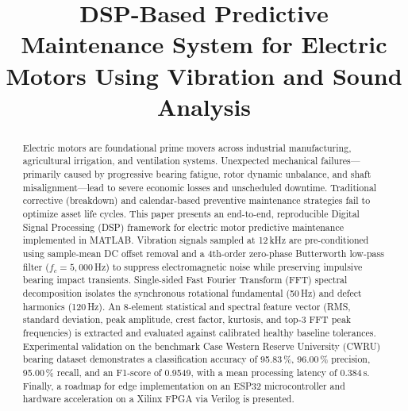 \documentclass[conference,a4paper]{IEEEtran}
\begin{document}
\title{DSP-Based Predictive Maintenance System for Electric Motors Using Vibration and Sound Analysis}

\author{
}

\maketitle

\begin{abstract}
Electric motors are foundational prime movers across industrial manufacturing, agricultural irrigation, and ventilation systems. Unexpected mechanical failures---primarily caused by progressive bearing fatigue, rotor dynamic unbalance, and shaft misalignment---lead to severe economic losses and unscheduled downtime. Traditional corrective (breakdown) and calendar-based preventive maintenance strategies fail to optimize asset life cycles. This paper presents an end-to-end, reproducible Digital Signal Processing (DSP) framework for electric motor predictive maintenance implemented in MATLAB. Vibration signals sampled at 12\,kHz are pre-conditioned using sample-mean DC offset removal and a 4th-order zero-phase Butterworth low-pass filter ($f_c = 5{,}000$\,Hz) to suppress electromagnetic noise while preserving impulsive bearing impact transients. Single-sided Fast Fourier Transform (FFT) spectral decomposition isolates the synchronous rotational fundamental (50\,Hz) and defect harmonics (120\,Hz). An 8-element statistical and spectral feature vector (RMS, standard deviation, peak amplitude, crest factor, kurtosis, and top-3 FFT peak frequencies) is extracted and evaluated against calibrated healthy baseline tolerances. Experimental validation on the benchmark Case Western Reserve University (CWRU) bearing dataset demonstrates a classification accuracy of 95.83\,\%, 96.00\,\% precision, 95.00\,\% recall, and an F1-score of 0.9549, with a mean processing latency of 0.384\,s. Finally, a roadmap for edge implementation on an ESP32 microcontroller and hardware acceleration on a Xilinx FPGA via Verilog is presented.
\end{abstract}
\end{document}
